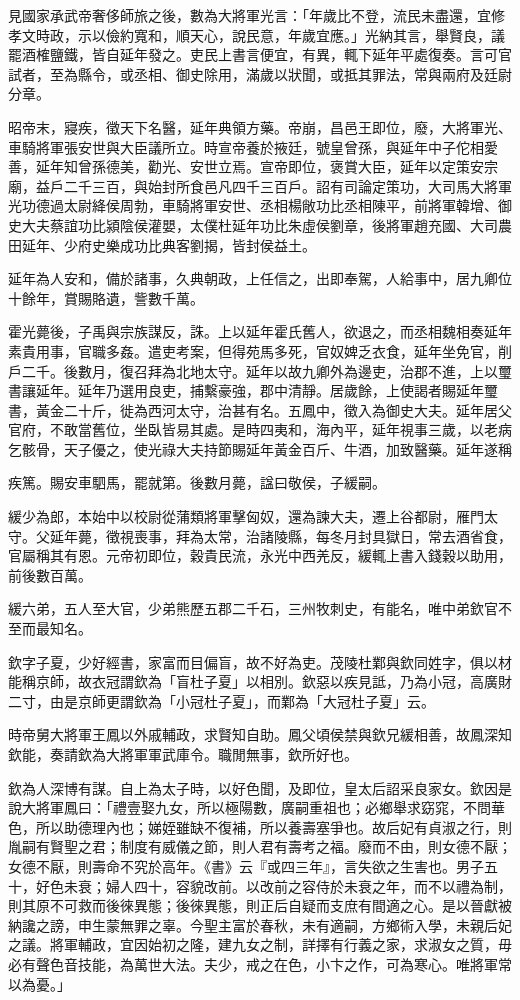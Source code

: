 \begin{pinyinscope}
見國家承武帝奢侈師旅之後，數為大將軍光言：「年歲比不登，流民未盡還，宜修孝文時政，示以儉約寬和，順天心，說民意，年歲宜應。」光納其言，舉賢良，議罷酒榷鹽鐵，皆自延年發之。吏民上書言便宜，有異，輒下延年平處復奏。言可官試者，至為縣令，或丞相、御史除用，滿歲以狀聞，或抵其罪法，常與兩府及廷尉分章。

昭帝末，寢疾，徵天下名醫，延年典領方藥。帝崩，昌邑王即位，廢，大將軍光、車騎將軍張安世與大臣議所立。時宣帝養於掖廷，號皇曾孫，與延年中子佗相愛善，延年知曾孫德美，勸光、安世立焉。宣帝即位，褒賞大臣，延年以定策安宗廟，益戶二千三百，與始封所食邑凡四千三百戶。詔有司論定策功，大司馬大將軍光功德過太尉絳侯周勃，車騎將軍安世、丞相楊敞功比丞相陳平，前將軍韓增、御史大夫蔡誼功比潁陰侯灌嬰，太僕杜延年功比朱虛侯劉章，後將軍趙充國、大司農田延年、少府史樂成功比典客劉揭，皆封侯益土。

延年為人安和，備於諸事，久典朝政，上任信之，出即奉駕，人給事中，居九卿位十餘年，賞賜賂遺，訾數千萬。

霍光薨後，子禹與宗族謀反，誅。上以延年霍氏舊人，欲退之，而丞相魏相奏延年素貴用事，官職多姦。遣吏考案，但得苑馬多死，官奴婢乏衣食，延年坐免官，削戶二千。後數月，復召拜為北地太守。延年以故九卿外為邊吏，治郡不進，上以璽書讓延年。延年乃選用良吏，捕繫豪強，郡中清靜。居歲餘，上使謁者賜延年璽書，黃金二十斤，徙為西河太守，治甚有名。五鳳中，徵入為御史大夫。延年居父官府，不敢當舊位，坐臥皆易其處。是時四夷和，海內平，延年視事三歲，以老病乞骸骨，天子優之，使光祿大夫持節賜延年黃金百斤、牛酒，加致醫藥。延年遂稱

疾篤。賜安車駟馬，罷就第。後數月薨，諡曰敬侯，子緩嗣。

緩少為郎，本始中以校尉從蒲類將軍擊匈奴，還為諫大夫，遷上谷都尉，雁門太守。父延年薨，徵視喪事，拜為太常，治諸陵縣，每冬月封具獄日，常去酒省食，官屬稱其有恩。元帝初即位，穀貴民流，永光中西羌反，緩輒上書入錢穀以助用，前後數百萬。

緩六弟，五人至大官，少弟熊歷五郡二千石，三州牧刺史，有能名，唯中弟欽官不至而最知名。

欽字子夏，少好經書，家富而目偏盲，故不好為吏。茂陵杜鄴與欽同姓字，俱以材能稱京師，故衣冠謂欽為「盲杜子夏」以相別。欽惡以疾見詆，乃為小冠，高廣財二寸，由是京師更謂欽為「小冠杜子夏」，而鄴為「大冠杜子夏」云。

時帝舅大將軍王鳳以外戚輔政，求賢知自助。鳳父頃侯禁與欽兄緩相善，故鳳深知欽能，奏請欽為大將軍軍武庫令。職閒無事，欽所好也。

欽為人深博有謀。自上為太子時，以好色聞，及即位，皇太后詔采良家女。欽因是說大將軍鳳曰：「禮壹娶九女，所以極陽數，廣嗣重祖也；必鄉舉求窈窕，不問華色，所以助德理內也；娣姪雖缺不復補，所以養壽塞爭也。故后妃有貞淑之行，則胤嗣有賢聖之君；制度有威儀之節，則人君有壽考之福。廢而不由，則女德不厭；女德不厭，則壽命不究於高年。《書》云『或四三年』，言失欲之生害也。男子五十，好色未衰；婦人四十，容貌改前。以改前之容侍於未衰之年，而不以禮為制，則其原不可救而後徠異態；後徠異態，則正后自疑而支庶有間適之心。是以晉獻被納讒之謗，申生蒙無罪之辜。今聖主富於春秋，未有適嗣，方鄉術入學，未親后妃之議。將軍輔政，宜因始初之隆，建九女之制，詳擇有行義之家，求淑女之質，毋必有聲色音技能，為萬世大法。夫少，戒之在色，小卞之作，可為寒心。唯將軍常以為憂。」


\end{pinyinscope}

